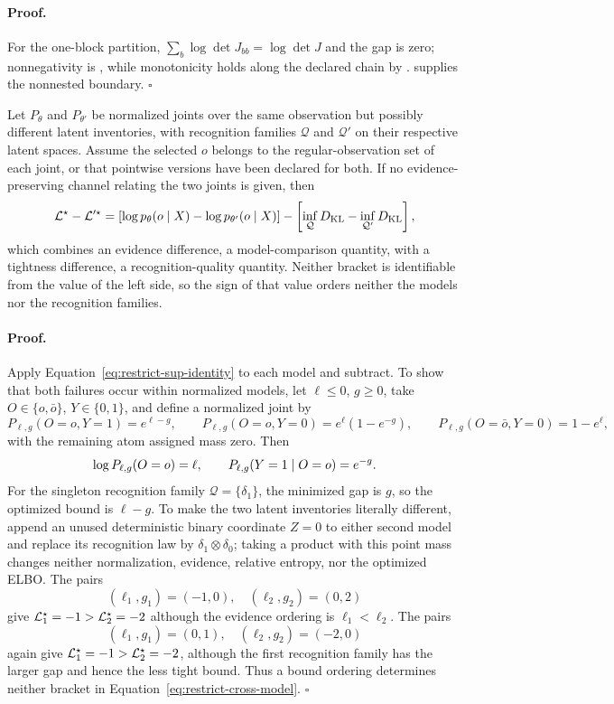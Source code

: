 \paragraph{Proof.}
For the one-block partition, $\sum_b\log\det J_{bb}=\log\det J$ and the gap is zero; nonnegativity is , while monotonicity holds along the declared chain by .  supplies the nonnested boundary. $\square$

Let $P_\theta$ and $P_{\theta'}$ be normalized joints over the same observation
but possibly different latent inventories, with recognition families
$\mathcal Q$ and $\mathcal Q'$ on their respective latent spaces. Assume the
selected $o$ belongs to the regular-observation set of each joint, or that
pointwise versions have been declared for both. If no evidence-preserving
channel relating the two joints is given, then
\begin{equation}
\mathcal L^\star-\mathcal L'^\star
=\left[\log p_\theta(o\mid X)-\log p_{\theta'}(o\mid X)\right]
-\left[\inf_{\mathcal Q}D_{\mathrm{KL}}-\inf_{\mathcal Q'}D_{\mathrm{KL}}\right],
\label{eq:restrict-cross-model}
\end{equation}
which combines an evidence difference, a model-comparison quantity, with a tightness difference, a recognition-quality quantity. Neither bracket is identifiable from the value of the left side, so the sign of that value orders neither the models nor the recognition families. 

\paragraph{Proof.}
Apply Equation~\eqref{eq:restrict-sup-identity} to each model and subtract. To show that both failures occur within normalized models, let \(\ell\leq0\), \(g\geq0\), take \(O\in\{o,\bar o\}\), \(Y\in\{0,1\}\), and define a normalized joint by
\[
P_{\ell,g}(O=o,Y=1)=e^{\ell-g},
\qquad
P_{\ell,g}(O=o,Y=0)=e^\ell(1-e^{-g}),
\qquad
P_{\ell,g}(O=\bar o,Y=0)=1-e^\ell,
\]
with the remaining atom assigned mass zero. Then
\[
\log P_{\ell,g}(O=o)=\ell,
\qquad
P_{\ell,g}(Y=1\mid O=o)=e^{-g}.
\]
For the singleton recognition family \(\mathcal Q=\{\delta_1\}\), the minimized gap is \(g\), so the optimized bound is \(\ell-g\). To make the two latent inventories literally different, append an unused deterministic binary coordinate \(Z=0\) to either second model and replace its recognition law by \(\delta_1\otimes\delta_0\); taking a product with this point mass changes neither normalization, evidence, relative entropy, nor the optimized ELBO. The pairs
\[
(\ell_1,g_1)=(-1,0),\quad(\ell_2,g_2)=(0,2)
\]
give \(\mathcal L_1^\star=-1>\mathcal L_2^\star=-2\) although the evidence ordering is \(\ell_1<\ell_2\). The pairs
\[
(\ell_1,g_1)=(0,1),\quad(\ell_2,g_2)=(-2,0)
\]
again give \(\mathcal L_1^\star=-1>\mathcal L_2^\star=-2\), although the first recognition family has the larger gap and hence the less tight bound. Thus a bound ordering determines neither bracket in Equation~\eqref{eq:restrict-cross-model}. $\square$

